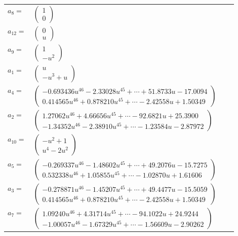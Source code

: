 \documentclass[1p]{elsarticle_modified}
\theoremstyle{definition}
\begin{document}
\begin{tabular}{m{7pt} m{180pt} m{7pt} m{180pt} }
\flushright $a_{8}=$&$\begin{pmatrix}1\\0\end{pmatrix}$ \\
\flushright $a_{12}=$&$\begin{pmatrix}0\\u\end{pmatrix}$ \\
\flushright $a_{9}=$&$\begin{pmatrix}1\\- u^2\end{pmatrix}$ \\
\flushright $a_{1}=$&$\begin{pmatrix}u\\- u^3+u\end{pmatrix}$ \\
\flushright $a_{4}=$&$\begin{pmatrix}-0.693436 u^{46}-2.33028 u^{45}+\cdots+51.8733 u-17.0094\\0.414565 u^{46}+0.878210 u^{45}+\cdots-2.42558 u+1.50349\end{pmatrix}$ \\
\flushright $a_{2}=$&$\begin{pmatrix}1.27062 u^{46}+4.66656 u^{45}+\cdots-92.6821 u+25.3900\\-1.34352 u^{46}-2.38910 u^{45}+\cdots-1.23584 u-2.87972\end{pmatrix}$ \\
\flushright $a_{10}=$&$\begin{pmatrix}- u^2+1\\u^4-2 u^2\end{pmatrix}$ \\
\flushright $a_{5}=$&$\begin{pmatrix}-0.269337 u^{46}-1.48602 u^{45}+\cdots+49.2076 u-15.7275\\0.532338 u^{46}+1.05855 u^{45}+\cdots-1.02870 u+1.61606\end{pmatrix}$ \\
\flushright $a_{3}=$&$\begin{pmatrix}-0.278871 u^{46}-1.45207 u^{45}+\cdots+49.4477 u-15.5059\\0.414565 u^{46}+0.878210 u^{45}+\cdots-2.42558 u+1.50349\end{pmatrix}$ \\
\flushright $a_{7}=$&$\begin{pmatrix}1.09240 u^{46}+4.31714 u^{45}+\cdots-94.1022 u+24.9244\\-1.00057 u^{46}-1.67329 u^{45}+\cdots-1.56609 u-2.90262\end{pmatrix}$ \\

\end{tabular}
\end{document}
